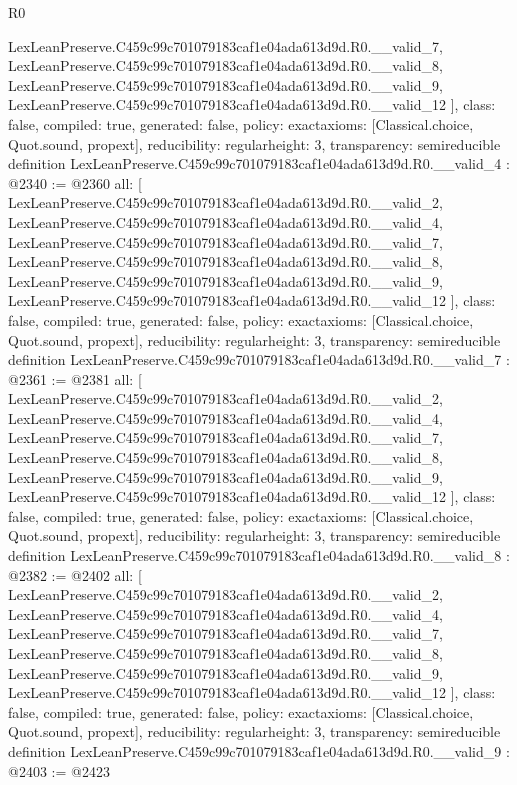 \begin{lexlean}{R0}
\begin{coremodule}
{    LexLeanPreserve.C459c99c701079183caf1e04ada613d9d.R0.__valid_7,
    LexLeanPreserve.C459c99c701079183caf1e04ada613d9d.R0.__valid_8,
    LexLeanPreserve.C459c99c701079183caf1e04ada613d9d.R0.__valid_9,
    LexLeanPreserve.C459c99c701079183caf1e04ada613d9d.R0.__valid_12
  ],
  class: false,
  compiled: true,
  generated: false,
  policy: exact{axioms: [Classical.choice, Quot.sound, propext]},
  reducibility: regular{height: 3},
  transparency: semireducible
}
definition LexLeanPreserve.C459c99c701079183caf1e04ada613d9d.R0.__valid_4 : @2340 := @2360 {
  all: [
    LexLeanPreserve.C459c99c701079183caf1e04ada613d9d.R0.__valid_2,
    LexLeanPreserve.C459c99c701079183caf1e04ada613d9d.R0.__valid_4,
    LexLeanPreserve.C459c99c701079183caf1e04ada613d9d.R0.__valid_7,
    LexLeanPreserve.C459c99c701079183caf1e04ada613d9d.R0.__valid_8,
    LexLeanPreserve.C459c99c701079183caf1e04ada613d9d.R0.__valid_9,
    LexLeanPreserve.C459c99c701079183caf1e04ada613d9d.R0.__valid_12
  ],
  class: false,
  compiled: true,
  generated: false,
  policy: exact{axioms: [Classical.choice, Quot.sound, propext]},
  reducibility: regular{height: 3},
  transparency: semireducible
}
definition LexLeanPreserve.C459c99c701079183caf1e04ada613d9d.R0.__valid_7 : @2361 := @2381 {
  all: [
    LexLeanPreserve.C459c99c701079183caf1e04ada613d9d.R0.__valid_2,
    LexLeanPreserve.C459c99c701079183caf1e04ada613d9d.R0.__valid_4,
    LexLeanPreserve.C459c99c701079183caf1e04ada613d9d.R0.__valid_7,
    LexLeanPreserve.C459c99c701079183caf1e04ada613d9d.R0.__valid_8,
    LexLeanPreserve.C459c99c701079183caf1e04ada613d9d.R0.__valid_9,
    LexLeanPreserve.C459c99c701079183caf1e04ada613d9d.R0.__valid_12
  ],
  class: false,
  compiled: true,
  generated: false,
  policy: exact{axioms: [Classical.choice, Quot.sound, propext]},
  reducibility: regular{height: 3},
  transparency: semireducible
}
definition LexLeanPreserve.C459c99c701079183caf1e04ada613d9d.R0.__valid_8 : @2382 := @2402 {
  all: [
    LexLeanPreserve.C459c99c701079183caf1e04ada613d9d.R0.__valid_2,
    LexLeanPreserve.C459c99c701079183caf1e04ada613d9d.R0.__valid_4,
    LexLeanPreserve.C459c99c701079183caf1e04ada613d9d.R0.__valid_7,
    LexLeanPreserve.C459c99c701079183caf1e04ada613d9d.R0.__valid_8,
    LexLeanPreserve.C459c99c701079183caf1e04ada613d9d.R0.__valid_9,
    LexLeanPreserve.C459c99c701079183caf1e04ada613d9d.R0.__valid_12
  ],
  class: false,
  compiled: true,
  generated: false,
  policy: exact{axioms: [Classical.choice, Quot.sound, propext]},
  reducibility: regular{height: 3},
  transparency: semireducible
}
definition LexLeanPreserve.C459c99c701079183caf1e04ada613d9d.R0.__valid_9 : @2403 := @2423 {
}
\end{coremodule}
\end{lexlean}
